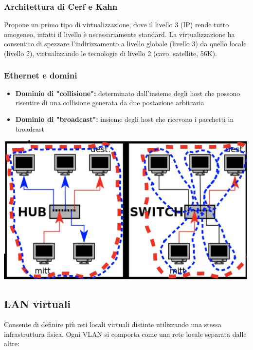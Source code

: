 \documentclass{report}
\begin{document}
\hypertarget{header-n287}{%
\subsubsection{Architettura di Cerf e Kahn}\label{header-n287}}

Propone un primo tipo di virtualizzazione, dove il livello 3 (IP) rende
tutto omogeneo, infatti il livello è necessariamente standard. La
virtualizzazione ha consentito di spezzare l'indirizzamento a livello
globale (livello 3) da quello locale (livello 2), virtualizzando le
tecnologie di livello 2 (cavo, satellite, 56K).

\hypertarget{header-n289}{%
\subsubsection{Ethernet e domini}\label{header-n289}}

\begin{itemize}
\item
  \textbf{Dominio di "collisione": }determinato dall'insieme degli host
  che possono risentire di una collisione generata da due postazione
  arbitraria
\item
  \textbf{Dominio di "broadcast": }insieme degli host che ricevono i
  pacchetti in broadcast
\end{itemize}

\begin{center}
		\includegraphics[width=0.7\linewidth]{domini}
	\end{center}

\hypertarget{header-n296}{%
\subsection{LAN virtuali}\label{header-n296}}

Consente di definire più reti locali virtuali distinte utilizzando una
stessa infrastruttura fisica. Ogni VLAN si comporta come una rete locale
separata dalle altre:
\end{document}
